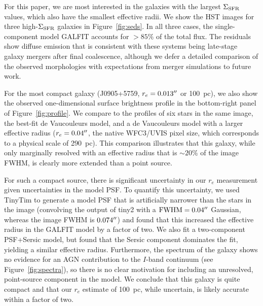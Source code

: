 \documentclass[apj]{emulateapj}
\newcommand{\sigmasfr}{\Sigma_{\textnormal{\scriptsize{SFR}}}}
\begin{document}
For this paper, we are most interested in the galaxies with the
largest $\sigmasfr$ values, which also have the smallest effective
radii.  We show the HST images for three high-$\sigmasfr$ galaxies in
Figure~\ref{fig:seds}.  In all three cases, the single-component model
GALFIT accounts for $>85\%$ of the total flux.  The residuals show
diffuse emission that is consistent with these systems being
late-stage galaxy mergers after final coalescence, although we defer a
detailed comparison of the observed morphologies with expectations
from merger simulations to future work.

For the most compact galaxy (J0905+5759, $r_e=0.013\mbox{$^{\prime\prime}$}$ or
100~pc), we also show the observed one-dimensional surface brightness
profile in the bottom-right panel of Figure~\ref{fig:profile}.  We
compare to the profiles of six stars in the same image, the best-fit
de Vaucouleurs model, and a de Vaucouleurs model with a larger
effective radius ($r_e=0.04\mbox{$^{\prime\prime}$}$, the native WFC3/UVIS pixel size,
which corresponds to a physical scale of 290~pc).  This comparison
illustrates that this galaxy, while only marginally resolved with an
effective radius that is $\sim20\%$ of the image FWHM, is clearly more
extended than a point source.

For such a compact source, there is significant uncertainty in our
$r_e$ measurement given uncertainties in the model PSF.  To quantify
this uncertainty, we used TinyTim to generate a model PSF that is
artificially narrower than the stars in the image (convolving the
output of tiny2 with a $\textnormal{FWHM}=0.04\mbox{$^{\prime\prime}$}$ Gaussian,
whereas the image FWHM is $0.074\mbox{$^{\prime\prime}$}$) and found that this
increased the effective radius in the GALFIT model by a factor of two.
We also fit a two-component PSF+Sersic model, but found that the
Sersic component dominates the fit, yielding a similar effective
radius.  Furthermore, the spectrum of the galaxy shows no evidence for
an AGN contribution to the $I$-band continuum (see
Figure~\ref{fig:spectra}), so there is no clear motivation for
including an unresolved, point-source component in the model.  We
conclude that this galaxy is quite compact and that our $r_e$ estimate
of 100~pc, while uncertain, is likely accurate within a factor of two.
\end{document}
